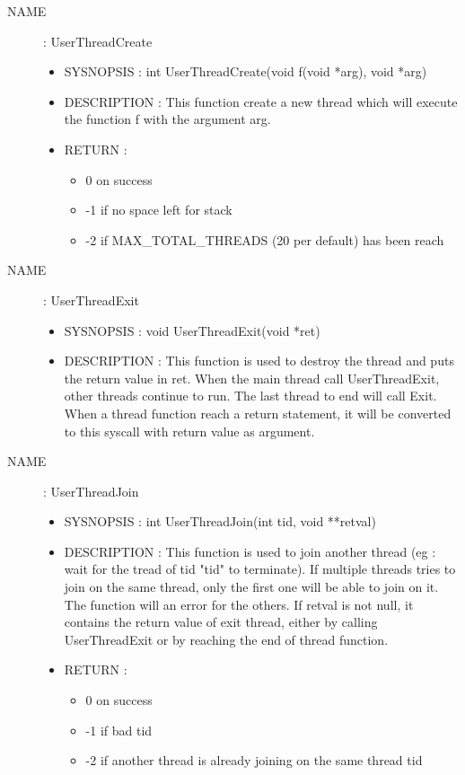 \documentclass[a4paper,10pt]{article}
\begin{document}
\begin{description}
    \item [NAME] : UserThreadCreate
        \begin{itemize}
            \item SYSNOPSIS : int UserThreadCreate(void f(void *arg), void *arg)
            \item DESCRIPTION :
                This function create a new thread which will execute the function f with the
                argument arg.
            \item RETURN :
                \begin{itemize}
                    \item 0 on success
                    \item -1 if no space left for stack
                    \item -2 if MAX\_TOTAL\_THREADS (20 per default) has been reach
                \end{itemize}
        \end{itemize}


    \item [NAME] : UserThreadExit
        \begin{itemize}
            \item SYSNOPSIS : void UserThreadExit(void *ret)
            \item DESCRIPTION :
                This function is used to destroy the thread and puts the return value in
                ret.
                When the main thread call UserThreadExit, other threads continue to
                run. The last thread to end will call Exit.
                When a thread function reach a return statement, it will be converted
                to this syscall with return value as argument.
        \end{itemize}

    \item [NAME] : UserThreadJoin
        \begin{itemize}
            \item SYSNOPSIS : int UserThreadJoin(int tid, void **retval)
            \item DESCRIPTION :
                This function is used to join another thread (eg : wait for the tread
                of tid "tid" to terminate). If multiple threads tries to join on the same
                thread, only the first one will be able to join on it. The function
                will an error for the others.
                If retval is not null, it contains the return value of exit thread,
                either by calling UserThreadExit or by reaching the end of thread function.
            \item RETURN :
                \begin{itemize}
                    \item 0 on success
                    \item -1 if bad tid
                    \item -2 if another thread is already joining on the same thread tid
                \end{itemize}
        \end{itemize}


\end{description}
\end{document}
